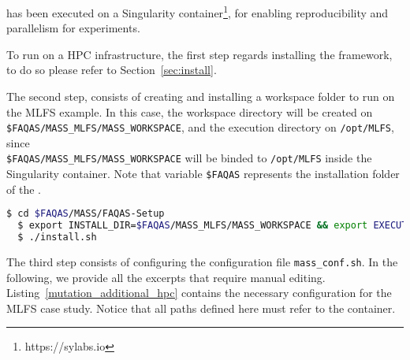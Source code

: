 \MASS has been executed on a Singularity container\footnote{https://sylabs.io}, for enabling reproducibility and parallelism for experiments.

To run \MASS on a HPC infrastructure, the first step regards installing the \MASS framework, to do so please refer to Section~\ref{sec:install}.

The second step, consists of creating and installing a workspace folder to run \MASS on the MLFS example. In this case, the workspace directory will be created on \\\texttt{\$FAQAS/MASS\_MLFS/MASS\_WORKSPACE}, and the execution directory on \texttt{/opt/MLFS}, since \\\texttt{\$FAQAS/MASS\_MLFS/MASS\_WORKSPACE} will be binded to \texttt{/opt/MLFS} inside the Singularity container.
Note that variable \texttt{\$FAQAS} represents the installation folder of the \FAQAS.

\begin{lstlisting}[language=bash]
  $ cd $FAQAS/MASS/FAQAS-Setup
  $ export INSTALL_DIR=$FAQAS/MASS_MLFS/MASS_WORKSPACE && export EXECUTION_DIR=/opt/MLFS
  $ ./install.sh
\end{lstlisting}

The third step consists of configuring the \MASS configuration file \texttt{mass\_conf.sh}. In the following, we provide all the excerpts that require manual editing. Listing~\ref{mutation_additional_hpc} contains the necessary configuration for the MLFS case study.
Notice that all paths defined here must refer to the container.

